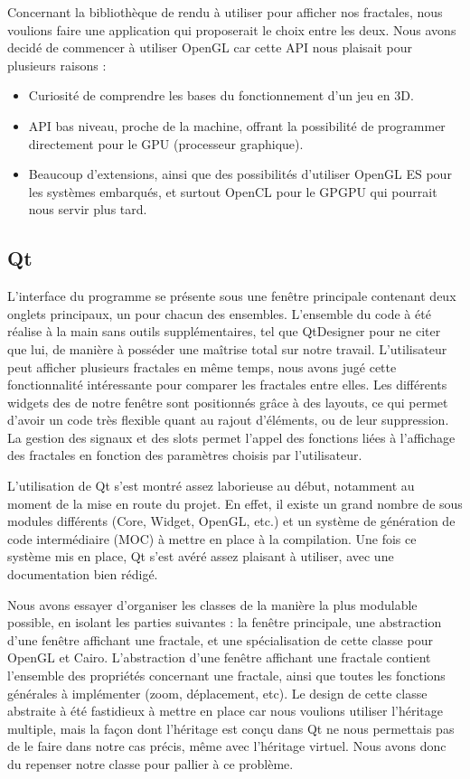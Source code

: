 \documentclass[11pt]{article}
\begin{document}
\vspace{10pt}
Concernant la bibliothèque de rendu à utiliser pour afficher nos fractales, nous
voulions faire une application qui proposerait le choix entre les deux.
Nous avons decidé de commencer à utiliser OpenGL car cette API nous plaisait
pour plusieurs raisons :
\begin{itemize}
    \item Curiosité de comprendre les bases du fonctionnement d'un jeu en 3D.
    \item API bas niveau, proche de la machine, offrant la possibilité de
        programmer directement pour le GPU (processeur graphique).
    \item Beaucoup d'extensions, ainsi que des possibilités d'utiliser OpenGL ES
        pour les systèmes embarqués, et surtout OpenCL pour le GPGPU qui
        pourrait nous servir plus tard.
\end{itemize}

\subsection{Qt}

L'interface du programme se présente sous une fenêtre principale contenant deux
onglets principaux, un pour chacun des ensembles. L'ensemble du code à été
réalise à la main sans outils supplémentaires, tel que QtDesigner pour ne citer
que lui, de manière à posséder une maîtrise total sur notre travail.
L'utilisateur peut afficher plusieurs fractales en même temps, nous avons jugé
cette fonctionnalité intéressante pour comparer les fractales entre elles. Les
différents widgets des de notre fenêtre sont positionnés grâce à des layouts, ce
qui permet d'avoir un code très flexible quant au rajout d'éléments, ou de leur
suppression. La gestion des signaux et des slots permet l'appel des fonctions
liées à l'affichage des fractales en fonction des paramètres choisis par
l'utilisateur.

L'utilisation de Qt s'est montré assez laborieuse au début, notamment au moment
de la mise en route du projet. En effet, il existe un grand nombre de sous
modules différents (Core, Widget, OpenGL, etc.) et un système de génération de
code intermédiaire (MOC) à mettre en place à la compilation. Une fois ce système
mis en place, Qt s'est avéré assez plaisant à utiliser, avec une documentation
bien rédigé.

Nous avons essayer d'organiser les classes de la manière la plus modulable
possible, en isolant les parties suivantes : la fenêtre principale, une
abstraction d'une fenêtre affichant une fractale, et une spécialisation de cette
classe pour OpenGL et Cairo. L'abstraction d'une fenêtre affichant une fractale
contient l'ensemble des propriétés concernant une fractale, ainsi que toutes les
fonctions générales à implémenter (zoom, déplacement, etc). Le design de cette
classe abstraite à été fastidieux à mettre en place car nous voulions utiliser
l'héritage multiple, mais la façon dont l'héritage est conçu dans Qt ne nous
permettais pas de le faire dans notre cas précis, même avec l'héritage virtuel.
Nous avons donc du repenser notre classe pour pallier à ce problème.
\end{document}
